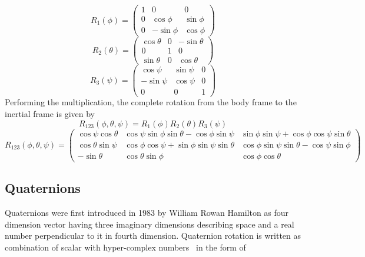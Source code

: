 \begin{equation*}
R_{1} (\phi )=\begin{pmatrix}
1 & 0 & 0\\
0 & \cos \phi  & \sin \phi \\
0 & -\sin \phi  & \cos \phi 
\end{pmatrix}
\end{equation*}
\begin{equation*}
R_{2} (\theta )=\begin{pmatrix}
\cos \theta  & 0 & -\sin \theta \\
0 & 1 & 0\\
\sin \theta  & 0 & \cos \theta 
\end{pmatrix}
\end{equation*}
\begin{equation*}
R_{3} (\psi )=\begin{pmatrix}
\cos \psi  & \sin \psi  & 0\\
-\sin \psi  & \cos \psi  & 0\\
0 & 0 & 1
\end{pmatrix}
\end{equation*}
Performing the multiplication, the complete rotation from the body frame to the inertial frame is given by
\begin{equation*}
    R_{123}( \phi ,\theta ,\psi ) =R_{1} (\phi )R_{2} (\theta )R_{3} (\psi )
\end{equation*}
\begin{equation*}
    R_{123} (\phi ,\theta ,\psi )=\begin{pmatrix}
\cos \psi \cos \theta  & \cos \psi \sin \phi \sin \theta -\cos \phi \sin \psi  & \sin \phi \sin \psi +\cos \phi \cos \psi \sin \theta \\
\cos \theta \sin \psi  & \cos \phi \cos \psi +\sin \phi \sin \psi \sin \theta  & \cos \phi \sin \psi \sin \theta -\cos \psi \sin \phi \\
-\sin \theta  & \cos \theta \sin \phi  & \cos \phi \cos \theta 
\end{pmatrix}
\end{equation*}

\subsection{Quaternions}
Quaternions were first introduced in 1983 by William Rowan Hamilton as four dimension vector having three imaginary dimensions describing space and a real number perpendicular to it in fourth dimension. Quaternion rotation is written as combination of scalar with hyper-complex numbers \ in the form of 


